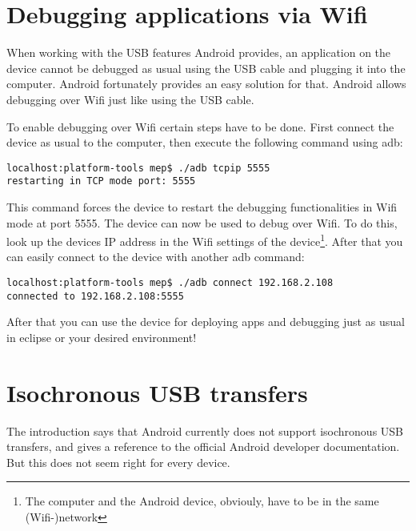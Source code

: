 \chapter{Debugging applications via Wifi}
\label{chapter:DetailedDescriptions}

When working with the USB features Android provides, an application on the device cannot be debugged as usual using the USB cable and plugging it into the computer. Android fortunately provides an easy solution for that. Android allows debugging over Wifi just like using the USB cable.

To enable debugging over Wifi certain steps have to be done. First connect the device as usual to the computer, then execute the following command using adb:

\lstset{language=bash}
\begin{lstlisting}[caption=Restart the device in Wifi debug mode., label=listing:wifi_debug]
localhost:platform-tools mep$ ./adb tcpip 5555
restarting in TCP mode port: 5555
\end{lstlisting}

This command forces the device to restart the debugging functionalities in Wifi mode at port 5555. The device can now be used to debug over Wifi. To do this, look up the devices IP address in the Wifi settings of the device\footnote{The computer and the Android device, obviouly, have to be in the same (Wifi-)network}. After that you can easily connect to the device with another adb command:

 \begin{lstlisting}[caption=Connect to the device over Wifi., label=listing:wifi_connect]
localhost:platform-tools mep$ ./adb connect 192.168.2.108
connected to 192.168.2.108:5555
 \end{lstlisting}
 
 After that you can use the device for deploying apps and debugging just as usual in eclipse or your desired environment!

\chapter{Isochronous USB transfers}

The introduction says that Android currently does not support isochronous USB transfers, and gives a reference to the official Android developer documentation\cite{android_usb_constants}. But this does not seem right for every device.

